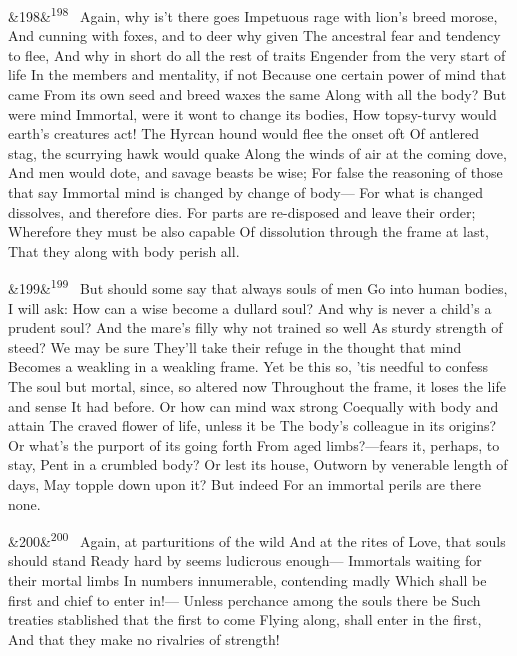 \documentclass[12pt]{article}
\newcommand{\para}[1][]{\par\noindent\ifx&#1&\else\textsuperscript{\footnotesize #1}~\fi}
\begin{document}
\para[198] Again, why is't there goes Impetuous rage with lion's breed morose, And cunning with foxes, and to deer why given The ancestral fear and tendency to flee, And why in short do all the rest of traits Engender from the very start of life In the members and mentality, if not Because one certain power of mind that came From its own seed and breed waxes the same Along with all the body? But were mind Immortal, were it wont to change its bodies, How topsy-turvy would earth's creatures act! The Hyrcan hound would flee the onset oft Of antlered stag, the scurrying hawk would quake Along the winds of air at the coming dove, And men would dote, and savage beasts be wise; For false the reasoning of those that say Immortal mind is changed by change of body--- For what is changed dissolves, and therefore dies. For parts are re-disposed and leave their order; Wherefore they must be also capable Of dissolution through the frame at last, That they along with body perish all.

\para[199] But should some say that always souls of men Go into human bodies, I will ask: How can a wise become a dullard soul? And why is never a child's a prudent soul? And the mare's filly why not trained so well As sturdy strength of steed? We may be sure They'll take their refuge in the thought that mind Becomes a weakling in a weakling frame. Yet be this so, 'tis needful to confess The soul but mortal, since, so altered now Throughout the frame, it loses the life and sense It had before. Or how can mind wax strong Coequally with body and attain The craved flower of life, unless it be The body's colleague in its origins? Or what's the purport of its going forth From aged limbs?---fears it, perhaps, to stay, Pent in a crumbled body? Or lest its house, Outworn by venerable length of days, May topple down upon it? But indeed For an immortal perils are there none.

\para[200] Again, at parturitions of the wild And at the rites of Love, that souls should stand Ready hard by seems ludicrous enough--- Immortals waiting for their mortal limbs In numbers innumerable, contending madly Which shall be first and chief to enter in!--- Unless perchance among the souls there be Such treaties stablished that the first to come Flying along, shall enter in the first, And that they make no rivalries of strength!
\end{document}

